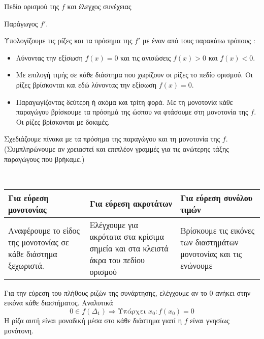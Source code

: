 \documentclass[a4paper,11pt,twoside]{article}
\def\xrwma{red!80!black}
\newcommand{\kerkissans}[1]{{\fontfamily{maksf}\selectfont {#1}}}
\newcounter{askhsh}[section]
\renewcommand{\theaskhsh}{\thesection.\arabic{askhsh}}
\newcommand{\Askhsh}{\refstepcounter{askhsh}{\textbf{\textcolor{\xrwma}{\faPenSquare\ \  \large \kerkissans{\textbf{Άσκηση\hspace{2mm}\theaskhsh}}}}}\hspace{1mm}}{}
\newenvironment{askhsh}[1]
{\begin{tcolorbox}[title=\Askhsh\ \ :\ \  {\textcolor{black}{\kerkissans{\bmath{#1}}}},breakable,
enhanced standard,titlerule=-.2pt,toprule=0pt, rightrule=0pt, bottomrule=0pt,
colback=white,left=2mm,top=1mm,bottom=0mm,
boxrule=0pt,
colframe=white,borderline west={1.5mm}{0pt}{\xrwma},leftrule=2mm,sharp corners,coltitle=\xrwma]}
{\end{tcolorbox}}
\begin{document}
\begin{askhsh}{Εύρεση μονοτονίας}
\begin{bhma}
\item Πεδίο ορισμού της $ f $ και έλεγχος συνέχειας
\item Παράγωγος $ f' $.
\item Υπολογίζουμε τις ρίζες και τα πρόσημα της $ f' $ με έναν από τους παρακάτω τρόπους :
\begin{itemize}
\item Λύνοντας την εξίσωση $ f(x)=0 $  και τις ανισώσεις $ f(x)>0 $ και $ f(x)<0 $.
\item Με επιλογή τιμής σε κάθε διάστημα που χωρίζουν οι ρίζες το πεδίο ορισμού. Οι ρίζες βρίσκονται και εδώ λύνοντας την εξίσωση $ f(x)=0 $.
\item Παραγωγίζοντας δεύτερη ή ακόμα και τρίτη φορά. Με τη μονοτονία κάθε παραγώγου βρίσκουμε τα πρόσημά της ώσπου να φτάσουμε στη μονοτονία της $ f $. Οι ρίζες βρίσκονται με δοκιμές.
\end{itemize}
\item Σχεδιάζουμε πίνακα με τα πρόσημα της παραγώγου και τη μονοτονία της $ f $. (Συμπληρώνουμε αν χρειαστεί και επιπλέον γραμμές για τις ανώτερης τάξης παραγώγους που βρήκαμε.)
\item\mbox{}\\\vspace{-7mm}
\begin{center}
\begin{tabular}{|p{5cm}|p{5cm}|p{5cm}|}
\hline
\rule[-2ex]{0pt}{5.5ex} \textbf{Για εύρεση μονοτονίας} & \textbf{Για εύρεση ακροτάτων} & \textbf{Για εύρεση συνόλου τιμών} \\
\hline
\rule[-2ex]{0pt}{5.5ex} Αναφέρουμε το είδος της μονοτονίας σε κάθε διάστημα ξεχωριστά. & Ελέγχουμε για ακρότατα στα κρίσιμα σημεία και στα κλειστά άκρα του πεδίου ορισμού & Βρίσκουμε τις εικόνες των διαστημάτων μονοτονίας και τις ενώνουμε \\
\hline
\end{tabular}
\end{center}
\item Για την εύρεση του πλήθους ριζών της συνάρτησης, ελέγχουμε αν το $ 0 $ ανήκει στην εικόνα κάθε διαστήματος. Αναλυτικά
\[ 0\in f(\Delta_1)\Rightarrow \textrm{Υπάρχει }x_0 : f(x_0)=0 \]
Η ρίζα αυτή είναι μοναδική μέσα στο κάθε διάστημα γιατί η $ f $ είναι γνησίως μονότονη.
\end{bhma}
\end{askhsh}
\end{document}
